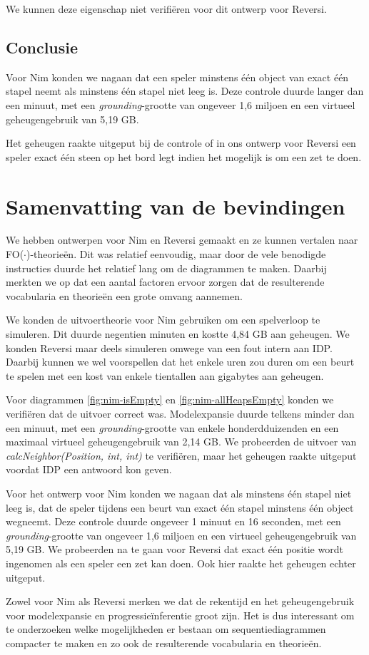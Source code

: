 We kunnen deze eigenschap niet verifi\"eren voor dit ontwerp voor Reversi.

\subsection{Conclusie}

Voor Nim konden we nagaan dat een speler minstens \'e\'en object van exact \'e\'en stapel neemt als minstens \'e\'en stapel niet leeg is. Deze controle duurde langer dan een minuut, met een \textit{grounding}-grootte van ongeveer 1,6 miljoen en een virtueel geheugengebruik van 5,19 GB.

Het geheugen raakte uitgeput bij de controle of in ons ontwerp voor Reversi een speler exact \'e\'en steen op het bord legt indien het mogelijk is om een zet te doen.

\section{Samenvatting van de bevindingen}
We hebben ontwerpen voor Nim en Reversi gemaakt en ze kunnen vertalen naar FO($\cdot$)-theorie\"en. Dit was relatief eenvoudig, maar door de vele benodigde instructies duurde het relatief lang om de diagrammen te maken. Daarbij merkten we op dat een aantal factoren ervoor zorgen dat de resulterende vocabularia en theorie\"en een grote omvang aannemen.

We konden de uitvoertheorie voor Nim gebruiken om een spelverloop te simuleren. Dit duurde negentien minuten en kostte 4,84 GB aan geheugen. We konden Reversi maar deels simuleren omwege van een fout intern aan IDP. Daarbij kunnen we wel voorspellen dat het enkele uren zou duren om een beurt te spelen met een kost van enkele tientallen aan gigabytes aan geheugen.

Voor diagrammen \ref{fig:nim-isEmpty} en \ref{fig:nim-allHeapsEmpty} konden we verifi\"eren dat de uitvoer correct was. Modelexpansie duurde telkens minder dan een minuut, met een \textit{grounding}-grootte van enkele honderdduizenden en een maximaal virtueel geheugengebruik van 2,14 GB. We probeerden de uitvoer van \textit{calcNeighbor(Position, int, int)} te verifi\"eren, maar het geheugen raakte uitgeput voordat IDP een antwoord kon geven.

Voor het ontwerp voor Nim konden we nagaan dat als minstens \'e\'en stapel niet leeg is, dat de speler tijdens een beurt van exact \'e\'en stapel minstens \'e\'en object wegneemt. Deze controle duurde ongeveer 1 minuut en 16 seconden, met een \textit{grounding}-grootte van ongeveer 1,6 miljoen en een virtueel geheugengebruik van 5,19 GB. We probeerden na te gaan voor Reversi dat exact \'e\'en positie wordt ingenomen als een speler een zet kan doen. Ook hier raakte het geheugen echter uitgeput.

Zowel voor Nim als Reversi merken we dat de rekentijd en het geheugengebruik voor modelexpansie en progressie\"inferentie groot zijn. Het is dus interessant om te onderzoeken welke mogelijkheden er bestaan om sequentiediagrammen compacter te maken en zo ook de resulterende vocabularia en theorie\"en.